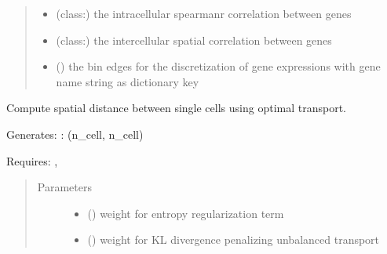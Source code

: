 \documentclass[letterpaper,10pt,english]{sphinxmanual}
\begin{document}
\begin{fulllineitems}
\begin{quote}
\begin{description}
\begin{itemize}
\item {} 
 (class:) \textendash{} the intracellular spearmanr correlation between genes 

\item {} 
 (class:) \textendash{} the intercellular spatial correlation between genes 

\item {} 
 () \textendash{} the bin edges for the discretization of gene expressions with gene name string as dictionary key 

\end{itemize}

\end{description}\end{quote}

\begin{fulllineitems}
\label{\detokenize{api:spaotsc.SpaOTsc.spatial_sc.cell_cell_distance}}
Compute spatial distance between single cells using optimal transport.

Generates: : (n\_cell, n\_cell) 

Requires: , 
\begin{quote}\begin{description}
\item[{Parameters}] \leavevmode\begin{itemize}
\item {} 
 (\sphinxstyleliteralemphasis{, }) \textendash{} weight for entropy regularization term

\item {} 
 (\sphinxstyleliteralemphasis{, }) \textendash{} weight for KL divergence penalizing unbalanced transport


\end{itemize}
\end{description}
\end{quote}
\end{fulllineitems}
\end{fulllineitems}
\end{document}

